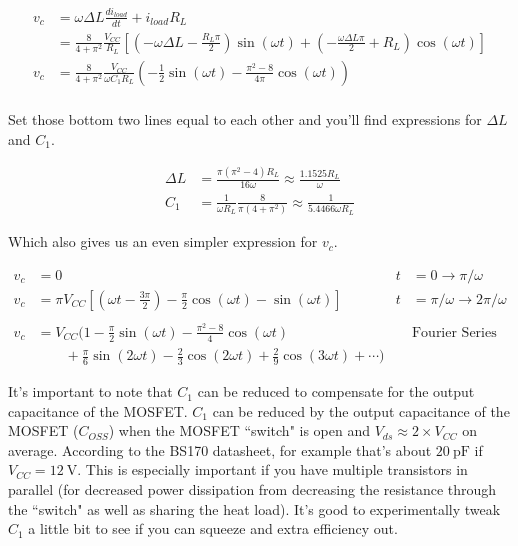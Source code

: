 \documentclass[10pt,letterpaper]{article}
\begin{document}
\begin{enumerate}
\begin{align*}
v_c &=\omega \Delta L \frac{di_{load}}{dt}+i_{load}R_L\\
&=\frac{8}{4+\pi^2}\frac{V_{CC}}{R_L}
\left[ \left(-\omega \Delta L-\frac{R_L\pi}{2}\right)\sin(\omega t)+\left(- \frac{\omega \Delta L\pi}{2}+R_L\right)\cos(\omega t)\right]\\
v_c &= \frac{8}{4+\pi^2}\frac{V_{CC}}{\omega C_1 R_L} \left( -\frac{1}{2}\sin(\omega t)-\frac{\pi^2-8}{4\pi}\cos(\omega t)\right)\\
\end{align*}

Set those bottom two lines equal to each other and you'll find expressions for $\Delta L$ and $C_1$.

\begin{align*}
\Delta L &=\frac{\pi(\pi^2-4)R_L}{16\omega}\approx  \frac{1.1525 R_L}{\omega}\\
C_1 & = \frac{1}{\omega R_L}\frac{8}{\pi(4+\pi^2)}\approx \frac{1}{5.4466 \omega R_L}
\end{align*}

Which also gives us an even simpler expression for $v_c$.

\begin{align*}
v_c &=0 &t&=0\rightarrow \pi/\omega\\
v_c &= \pi V_{CC} \left[ \left(\omega t-\frac{3\pi}{2}\right)-\frac{\pi}{2} \cos(\omega t)-\sin(\omega t) \right] &t&=\pi/\omega \rightarrow 2\pi/\omega\\ \\
v_c &= V_{CC}\Big( 1-\frac{\pi}{2}\sin(\omega t)-\frac{\pi^2-8}{4}\cos(\omega t) &&\text{Fourier Series}\\
&\qquad +\frac{\pi}{6}\sin(2\omega t)-\frac{2}{3}\cos(2\omega t)+\frac{2}{9}\cos(3\omega t)+\cdots \Big)
\end{align*}

It's important to note that $C_1$ can be reduced to compensate for the output capacitance of the MOSFET. $C_1$ can be reduced by the output capacitance of the MOSFET ($C_{OSS}$) when the MOSFET ``switch" is open and $V_{ds}\approx2\times V_{CC}$ on average. According to the BS170 datasheet, for example that's about $\SI{20}{\pico\farad}$ if $V_{CC}=\SI{12}{\volt}$. This is especially important if you have multiple transistors in parallel (for decreased power dissipation from decreasing the resistance through the ``switch" as well as sharing the heat load). It's good to experimentally tweak $C_1$ a little bit to see if you can squeeze and extra efficiency out.


\end{enumerate}
\end{document}
